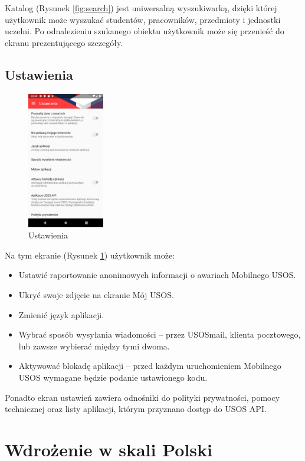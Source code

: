\documentclass{pracamgr}
\begin{document}
Katalog (Rysunek \ref{fig:search}) jest uniwersalną wyszukiwarką, dzięki której użytkownik może wyszukać
studentów, pracowników, przedmioty i jednostki uczelni. Po odnalezieniu szukanego
obiektu użytkownik może się przenieść do ekranu prezentującego szczegóły.

\section{Ustawienia}

\begin{figure}[p]
	\centering
	\includegraphics[width=0.3\textwidth]{img/settings.png}
	\caption{Ustawienia}\label{fig:settings}
	\medskip
\end{figure}

Na tym ekranie (Rysunek \ref{fig:settings}) użytkownik może:

\begin{itemize}
	\item Ustawić raportowanie anonimowych informacji o awariach Mobilnego USOS.
	\item Ukryć swoje zdjęcie na ekranie Mój USOS.
	\item Zmienić język aplikacji.
	\item Wybrać sposób wysyłania wiadomości -- przez USOSmail, klienta pocztowego,
	lub zawsze wybierać między tymi dwoma.
	\item Aktywować blokadę aplikacji -- przed każdym uruchomieniem Mobilnego USOS
	wymagane będzie podanie ustawionego kodu.
\end{itemize}

Ponadto ekran ustawień zawiera odnośniki do polityki prywatności, pomocy technicznej
oraz listy aplikacji, którym przyznano dostęp do USOS API.

\chapter{Wdrożenie w skali Polski}
\end{document}

